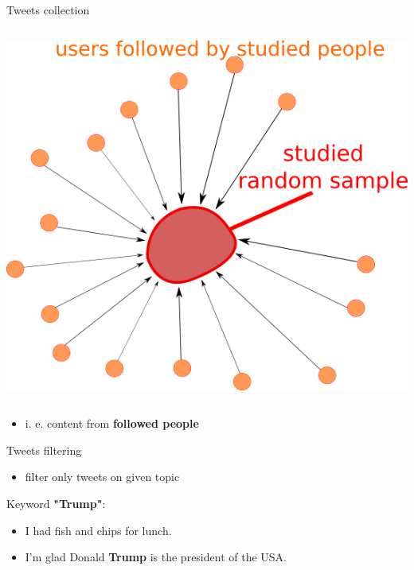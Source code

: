 \documentclass[final]{beamer}
\newcommand{\cmark}{\ding{51}} %
\newcommand{\xmark}{\ding{55}} %
\begin{document}
\begin{frame}[fragile]
\begin{columns}[T]
\begin{column}{.33\textwidth}
\begin{block}{Tweets collection}
\begin{columns}
    	\includegraphics[scale=0.65]{./Pics/followers.png}
    \end{columns}
    \vspace{0.8cm}
    \begin{itemize}
        \item i. e. content from \textbf{followed people}
    \end{itemize}
\end{block}
\begin{block}{Tweets filtering}
\begin{itemize}
    \item filter only tweets on given topic
\end{itemize}
\vspace{0.3cm}
Keyword \textbf{"Trump"}:
\vspace{0.7cm}
\begin{itemize}\centering
    \item[\textcolor{black}{\xmark}] I had fish and chips for lunch.
    \item[\textcolor{black}{\cmark}] I'm glad Donald \textbf{Trump} is the president of the USA.
\end{itemize}
\end{block}

\end{column}
\end{columns}
\end{frame}
\end{document}
